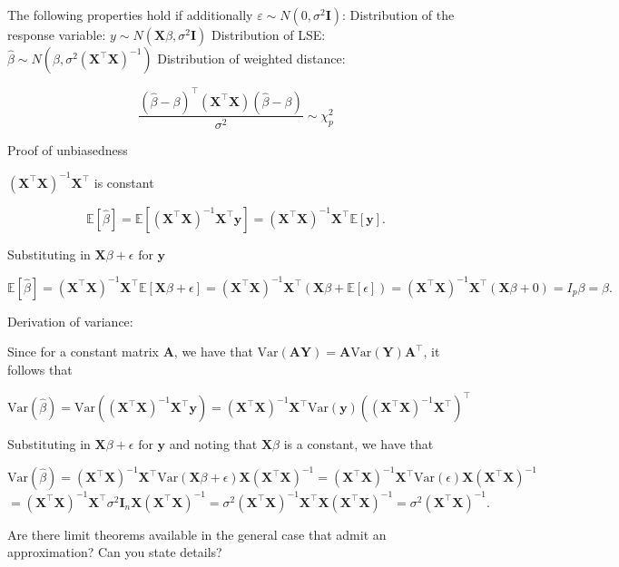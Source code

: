 The following properties hold if additionally \(\varepsilon \sim N(0, \sigma^2 \mathbf{I})\):
Distribution of the response variable: \(y \sim N(\mathbf{X}\beta, \sigma^2 \mathbf{I})\)
Distribution of LSE: \(\hat{\beta} \sim N(\beta, \sigma^2 (\mathbf{X}^\top \mathbf{X})^{-1})\)
Distribution of weighted distance:

\[
\frac{(\hat{\beta} - \beta)^\top (\mathbf{X}^\top \mathbf{X})(\hat{\beta} - \beta)}{\sigma^2} \sim \chi^2_p
\]

Proof of unbiasedness

\((\mathbf{X}^\top \mathbf{X})^{-1}\mathbf{X}^\top\) is constant 

\[
\mathbb{E} \left[ \hat{\beta} \right] = \mathbb{E} \left[ (\mathbf{X}^\top \mathbf{X})^{-1}\mathbf{X}^\top \mathbf{y} \right] = (\mathbf{X}^\top \mathbf{X})^{-1}\mathbf{X}^\top \mathbb{E}[\mathbf{y}].
\]

Substituting in \(\mathbf{X}\beta + \epsilon \text{ for } \mathbf{y}\)

\[
\mathbb{E} \left[ \hat{\beta} \right] = (\mathbf{X}^\top \mathbf{X})^{-1}\mathbf{X}^\top \mathbb{E}[\mathbf{X}\beta + \epsilon]
= (\mathbf{X}^\top \mathbf{X})^{-1}\mathbf{X}^\top (\mathbf{X}\beta + \mathbb{E}[\epsilon])
= (\mathbf{X}^\top \mathbf{X})^{-1}\mathbf{X}^\top (\mathbf{X}\beta + 0)
= I_p \beta
= \beta.
\]

Derivation of variance:

Since for a constant matrix \( \mathbf{A} \), we have that \( \text{Var}(\mathbf{AY}) = \mathbf{A} \text{Var}(\mathbf{Y}) \mathbf{A}^\top \), 
it follows that

\[
\text{Var}(\hat{\beta}) = \text{Var} \left( (\mathbf{X}^\top \mathbf{X})^{-1} \mathbf{X}^\top \mathbf{y} \right)
= (\mathbf{X}^\top \mathbf{X})^{-1} \mathbf{X}^\top \text{Var}(\mathbf{y}) \left( (\mathbf{X}^\top \mathbf{X})^{-1} \mathbf{X}^\top \right)^\top
\]

Substituting in \( \mathbf{X}\beta + \epsilon \text{ for } \mathbf{y} \) and noting that \( \mathbf{X}\beta \) is a constant, we have that

\[
\text{Var}(\hat{\beta}) = (\mathbf{X}^\top \mathbf{X})^{-1} \mathbf{X}^\top \text{Var}(\mathbf{X}\beta + \epsilon) \mathbf{X} (\mathbf{X}^\top \mathbf{X})^{-1}
= (\mathbf{X}^\top \mathbf{X})^{-1} \mathbf{X}^\top \text{Var}(\epsilon) \mathbf{X} (\mathbf{X}^\top \mathbf{X})^{-1}
\]
\[
= (\mathbf{X}^\top \mathbf{X})^{-1} \mathbf{X}^\top \sigma^2 \mathbf{I}_n \mathbf{X} (\mathbf{X}^\top \mathbf{X})^{-1}
= \sigma^2 (\mathbf{X}^\top \mathbf{X})^{-1} \mathbf{X}^\top \mathbf{X} (\mathbf{X}^\top \mathbf{X})^{-1}
= \sigma^2 (\mathbf{X}^\top \mathbf{X})^{-1}.
\]


Are there limit theorems available in the general case that admit an approximation?
Can you state details?
